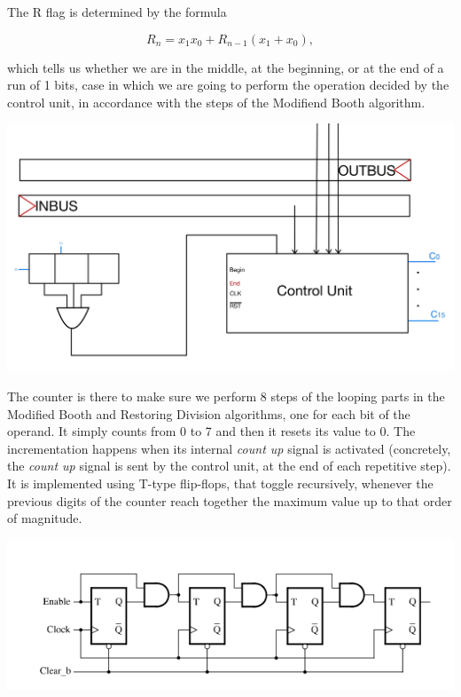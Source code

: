 \documentclass[12pt, letterpaper]{article}
\begin{document}
The R flag is determined by the formula

\[ R_n = x_1x_0 + R_{n - 1}(x_1 + x_0), \]

which tells us whether we are in the middle, at the beginning, or at the end of a run of 1 bits, case in which we are going to perform the operation
decided by the control unit, in accordance with the steps of the Modifiend Booth algorithm.

\begin{center}
\includegraphics[scale=0.3]{Documentation/ALU_3}
\end{center}

The counter is there to make sure we perform 8 steps of the looping parts in the Modified Booth and Restoring Division algorithms, one for each bit
of the operand. It simply counts from 0 to 7 and then it resets its value to 0. The incrementation happens when its internal \textit{count up} signal
is activated (concretely, the \textit{count up} signal is sent by the control unit, at the end of each repetitive step). It is implemented using
T-type flip-flops, that toggle recursively, whenever the previous digits of the counter reach together the maximum value up to that order of
magnitude.\\

\begin{center}
\includegraphics[scale=0.6]{Documentation/counter}
\end{center}
\end{document}
